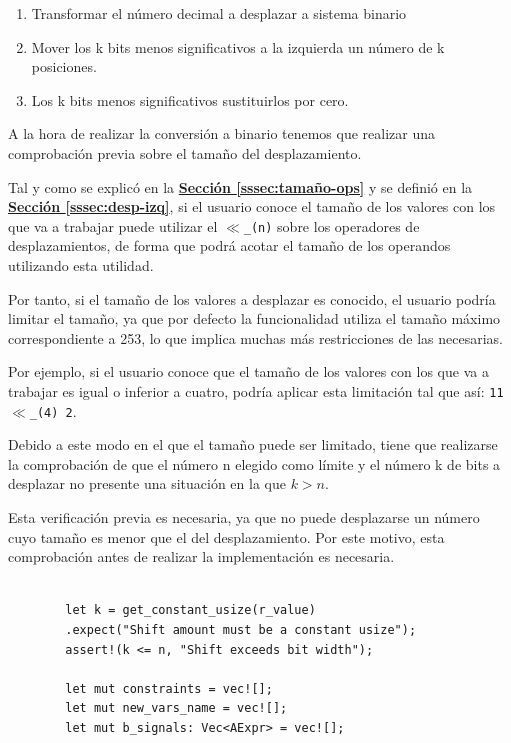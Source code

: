 \documentclass[a4paper,12pt]{report}
\begin{document}
	\begin{enumerate}
		\item Transformar el número decimal a desplazar a sistema binario
		\item Mover los k bits menos significativos a la izquierda un número de k posiciones.
		\item Los k bits menos significativos sustituirlos por cero.
	\end{enumerate}
	
	\vspace{0.2cm}
	\noindent A la hora de realizar la conversión a binario tenemos que realizar una  comprobación previa sobre el tamaño del desplazamiento.
	
	\vspace{0.2cm}
	\noindent Tal y como se explicó en la \hyperref[sssec:tamaño-ops]{\textbf{Sección \ref{sssec:tamaño-ops}}} y se definió en la \hyperref[sssec:desp-izq]{\textbf{Sección \ref{sssec:desp-izq}}}, si el usuario conoce el tamaño de los valores con los que va a trabajar puede utilizar el \texttt{$\ll$\_(n)} sobre los operadores de desplazamientos, de forma que podrá acotar el tamaño de los operandos utilizando esta utilidad.
	
	\vspace{0.2cm}
	\noindent Por tanto, si el tamaño de los valores a desplazar es conocido, el usuario podría limitar el tamaño, ya que por defecto la funcionalidad utiliza el tamaño máximo correspondiente a 253, lo que implica muchas más restricciones de las necesarias.
	
	\vspace{0.2cm}
	\noindent Por ejemplo, si el usuario conoce que el tamaño de los valores con los que va a trabajar es igual o inferior a cuatro, podría aplicar esta limitación tal que así: \texttt{11 $\ll$\_(4) 2}.
	
	\vspace{0.2cm}
	\noindent Debido a este modo en el que el tamaño puede ser limitado, tiene que realizarse la comprobación de que el número n elegido como límite y el número k de bits a desplazar no presente una situación en la que $k > n$.
	
	\vspace{0.2cm}
	\noindent Esta verificación previa es necesaria, ya que no puede desplazarse un número cuyo tamaño es menor que el del desplazamiento. Por este motivo, esta comprobación antes de realizar la implementación es necesaria.
	
	\vspace{0.3cm}
	\begin{lstlisting}[style=RustStyle, caption={},         basicstyle=\ttfamily\scriptsize, 
		xleftmargin=0pt
		]
		
		let k = get_constant_usize(r_value)
		.expect("Shift amount must be a constant usize");
		assert!(k <= n, "Shift exceeds bit width");
		
		let mut constraints = vec![];
		let mut new_vars_name = vec![];
		let mut b_signals: Vec<AExpr> = vec![];
		
		
	\end{lstlisting}
	
\end{document}

